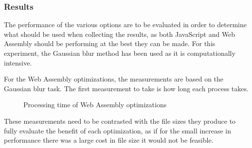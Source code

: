 \documentclass[12pt,a4paper]{article}
\begin{document}
\subsubsection{Results}

The performance of the various options are to be evaluated in order to determine what should be used when collecting the results, as both JavaScript and Web Assembly should be performing at the best they can be made. For this experiment, the Gaussian blur method has been used as it is computationally intensive.

For the Web Assembly optimizations, the measurements are based on the Gaussian blur task. The first measurement to take is how long each process takes.

\begin{figure}[H]
    \centering
    \caption{Processing time of Web Assembly optimizations}
\end{figure}

These measurements need to be contrasted with the file sizes they produce to fully evaluate the benefit of each optimization, as if for the small increase in performance there was a large cost in file size it would not be feasible.
\end{document}
